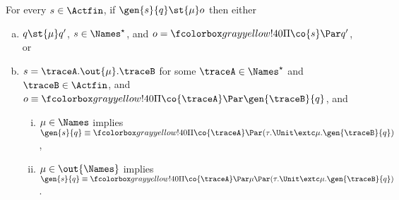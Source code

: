 \begin{lemma}
  \label{lem:gs-visible-action}
  For every $s \in \Actfin$,
  if $\gen{s}{q} \st{ \mu } o$
  then either
  \begin{enumerate}[(a)]
  \item $q \st{\mu} q'$, $s \in \Names^\star$, and $o = \mailbox{ \Pi \co{s}} \Par q'$, or
  \item
    $s = \traceA. \out{\mu}. \traceB$ for some $\traceA \in \Names^{\star}$ and $\traceB \in \Actfin$,
    and $o \equiv \mailbox{ \Pi \co{\traceA} } \Par \gen{\traceB}{q}$,
    and
    \begin{enumerate}[(i)]
    \item $\mu \in \Names$ implies $\gen{s}{q} \equiv \mailbox{ \Pi \co{\traceA} } \Par (\tau.\Unit \extc \mu.\gen{\traceB}{q})$,
    \item $\mu \in \out{\Names}$ implies $\gen{s}{q} \equiv \mailbox{ \Pi \co{\traceA} \Par \mu } \Par (\tau.\Unit \extc \mu.\gen{\traceB}{q})$.
    \end{enumerate}
  \end{enumerate}
\end{lemma}
